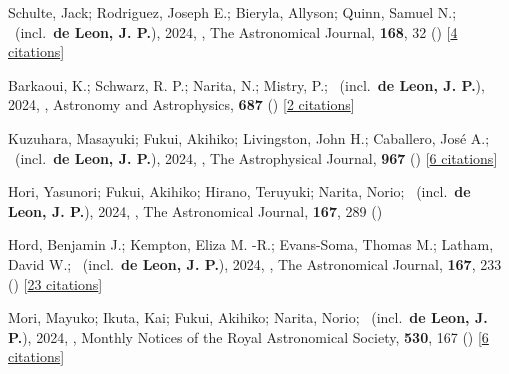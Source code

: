 \item[{\color{numcolor}\scriptsize68}] Schulte, Jack; Rodriguez, Joseph E.; Bieryla, Allyson; Quinn, Samuel N.; \etal\ (incl.\ \textbf{de Leon, J. P.}), 2024, , The Astronomical Journal, \textbf{168}, 32 () [\href{https://ui.adsabs.harvard.edu/abs/2024AJ....168...32S}{4 citations}]

\item[{\color{numcolor}\scriptsize67}] Barkaoui, K.; Schwarz, R. P.; Narita, N.; Mistry, P.; \etal\ (incl.\ \textbf{de Leon, J. P.}), 2024, , Astronomy and Astrophysics, \textbf{687} () [\href{https://ui.adsabs.harvard.edu/abs/2024A&A...687A.264B}{2 citations}]

\item[{\color{numcolor}\scriptsize66}] Kuzuhara, Masayuki; Fukui, Akihiko; Livingston, John H.; Caballero, Jos{\'e} A.; \etal\ (incl.\ \textbf{de Leon, J. P.}), 2024, , The Astrophysical Journal, \textbf{967} () [\href{https://ui.adsabs.harvard.edu/abs/2024ApJ...967L..21K}{6 citations}]

\item[{\color{numcolor}\scriptsize65}] Hori, Yasunori; Fukui, Akihiko; Hirano, Teruyuki; Narita, Norio; \etal\ (incl.\ \textbf{de Leon, J. P.}), 2024, , The Astronomical Journal, \textbf{167}, 289 ()

\item[{\color{numcolor}\scriptsize64}] Hord, Benjamin J.; Kempton, Eliza M. -R.; Evans-Soma, Thomas M.; Latham, David W.; \etal\ (incl.\ \textbf{de Leon, J. P.}), 2024, , The Astronomical Journal, \textbf{167}, 233 () [\href{https://ui.adsabs.harvard.edu/abs/2024AJ....167..233H}{23 citations}]

\item[{\color{numcolor}\scriptsize63}] Mori, Mayuko; Ikuta, Kai; Fukui, Akihiko; Narita, Norio; \etal\ (incl.\ \textbf{de Leon, J. P.}), 2024, , Monthly Notices of the Royal Astronomical Society, \textbf{530}, 167 () [\href{https://ui.adsabs.harvard.edu/abs/2024MNRAS.530..167M}{6 citations}]

